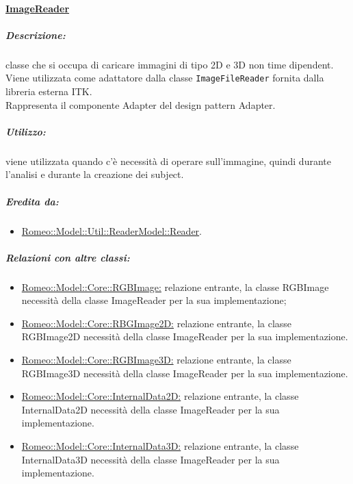 		\paragraph{\underline{ImageReader}}
		\label{rea_img}
			\subparagraph{Descrizione:} classe che si occupa di caricare immagini di tipo 2D e 3D non time dipendent. Viene utilizzata come adattatore dalla classe \verb!ImageFileReader! fornita dalla libreria esterna ITK\g{}.
			\\Rappresenta il componente Adapter del design pattern\g{} Adapter.
			\subparagraph{Utilizzo:} viene utilizzata quando c'è necessità di operare sull'immagine, quindi durante l'analisi e durante la creazione dei subject.
			\subparagraph{Eredita da:}
				\begin{itemize}
					\item \hyperref[reader]{Romeo::Model::Util::ReaderModel::Reader}.
				\end{itemize}
			\subparagraph{Relazioni con altre classi:}
					\begin{itemize}
						\item \hyperref[]{Romeo::Model::Core::RGBImage:} relazione entrante, la classe RGBImage necessità della classe ImageReader per la sua implementazione;
						\item \hyperref[]{Romeo::Model::Core::RBGImage2D:} relazione entrante, la classe RGBImage2D necessità della classe ImageReader per la sua implementazione.					
						\item \hyperref[]{Romeo::Model::Core::RGBImage3D:}	relazione entrante, la classe RGBImage3D necessità della classe ImageReader per la sua implementazione.					
						\item \hyperref[]{Romeo::Model::Core::InternalData2D:}	relazione entrante, la classe InternalData2D necessità della classe ImageReader per la sua implementazione.
						\item \hyperref[]{Romeo::Model::Core::InternalData3D:}	relazione entrante, la classe InternalData3D necessità della classe ImageReader per la sua implementazione.						
					\end{itemize}

